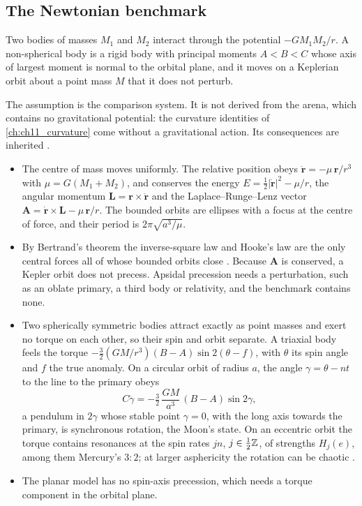 \subsection{The Newtonian benchmark}
\label{sec:orbital:newton}

\begin{assumption}
\label{assum:newton}
Two bodies of masses $M_1$ and $M_2$ interact through the potential $-GM_1M_2/r$. A non-spherical body is a rigid body with principal moments
$A<B<C$ whose axis of largest moment is normal to the orbital plane, and it moves on a Keplerian orbit about a point mass $M$ that it does not
perturb.
\end{assumption}

The assumption is the comparison system. It is not derived from the arena, which contains no gravitational potential: the curvature identities
of \cref{ch:ch11_curvature} come without a gravitational action. Its consequences are inherited
\cite{ArnoldMMCM,LandauLifshitz1,GoldreichPeale66,MurrayDermott99}.
\begin{itemize}
\item The centre of mass moves uniformly. The relative position obeys $\ddot{\mathbf r}=-\mu\,\mathbf r/r^3$ with $\mu=G(M_1+M_2)$, and conserves the
energy $E=\tfrac12|\dot{\mathbf r}|^2-\mu/r$, the angular momentum $\mathbf L=\mathbf r\times\dot{\mathbf r}$ and the Laplace--Runge--Lenz vector
$\mathbf A=\dot{\mathbf r}\times\mathbf L-\mu\,\mathbf r/r$. The bounded orbits are ellipses with a focus at the centre of force, and their period is
$2\pi\sqrt{a^3/\mu}$.
\item By Bertrand's theorem the inverse-square law and Hooke's law are the only central forces all of whose bounded orbits close
\cite{Bertrand1873,ArnoldMMCM}. Because $\mathbf A$ is conserved, a Kepler orbit does not precess. Apsidal precession needs a perturbation, such as
an oblate primary, a third body or relativity, and the benchmark contains none.
\item Two spherically symmetric bodies attract exactly as point masses and exert no torque on each other, so their spin and orbit separate. A
triaxial body feels the torque $-\tfrac32(GM/r^3)(B-A)\sin2(\theta-f)$, with $\theta$ its spin angle and $f$ the true anomaly. On a circular orbit of
radius $a$, the angle $\gamma=\theta-nt$ to the line to the primary obeys
\begin{equation}
\label{eq:spinorbit}
C\ddot\gamma=-\tfrac32\,\frac{GM}{a^3}\,(B-A)\sin2\gamma ,
\end{equation}
a pendulum in $2\gamma$ whose stable point $\gamma=0$, with the long axis towards the primary, is synchronous rotation, the Moon's state. On an
eccentric orbit the torque contains resonances at the spin rates $jn$, $j\in\tfrac12\mathbb{Z}$, of strengths $H_j(e)$, among them Mercury's $3{:}2$;
at larger asphericity the rotation can be chaotic \cite{GoldreichPeale66,MurrayDermott99,WisdomPealeMignard84}.
\item The planar model has no spin-axis precession, which needs a torque component in the orbital plane.
\end{itemize}


